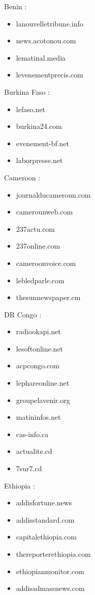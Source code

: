 \documentclass[
  letterpaper,
  DIV=11,
  numbers=noendperiod]{scrartcl}
\providecommand{\tightlist}{%
  \setlength{\itemsep}{0pt}\setlength{\parskip}{0pt}}\usepackage{longtable,booktabs,array}
\begin{document}
Benin :

\begin{itemize}
\tightlist
\item
  lanouvelletribune.info
\item
  news.acotonou.com
\item
  lematinal.media
\item
  levenementprecis.com
\end{itemize}

Burkina Faso :

\begin{itemize}
\tightlist
\item
  lefaso.net
\item
  burkina24.com
\item
  evenement-bf.net
\item
  laborpresse.net
\end{itemize}

Cameroon :

\begin{itemize}
\tightlist
\item
  journalducameroun.com
\item
  camerounweb.com
\item
  237actu.com
\item
  237online.com
\item
  cameroonvoice.com
\item
  lebledparle.com
\item
  thesunnewspaper.cm
\end{itemize}

DR Congo :

\begin{itemize}
\tightlist
\item
  radiookapi.net
\item
  lesoftonline.net
\item
  acpcongo.com
\item
  lephareonline.net
\item
  groupelavenir.org
\item
  matininfos.net
\item
  cas-info.ca
\item
  actualite.cd
\item
  7sur7.cd
\end{itemize}

Ethiopia :

\begin{itemize}
\tightlist
\item
  addisfortune.news
\item
  addisstandard.com
\item
  capitalethiopia.com
\item
  thereporterethiopia.com
\item
  ethiopianmonitor.com
\item
  addisadmassnews.com
\end{itemize}
\end{document}
